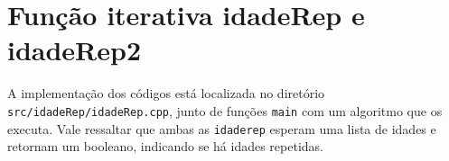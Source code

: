\section{Função iterativa idadeRep e idadeRep2}
A implementação dos códigos está localizada no diretório \texttt{src/idadeRep/idadeRep.cpp}, junto de funções \texttt{main} com um algoritmo que os executa. Vale ressaltar que ambas as \texttt{idaderep} esperam uma lista de idades e retornam um booleano, indicando se há idades repetidas.

